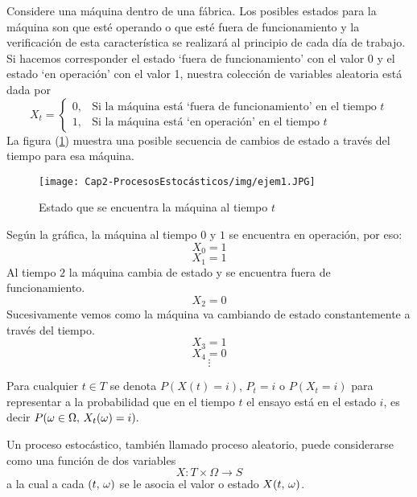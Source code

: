 \begin{Ejm}
    Considere una máquina dentro de una fábrica. Los
    posibles estados para la máquina son que esté operando o que esté fuera de funcionamiento
    y la verificación de esta característica se realizará al principio de cada día de trabajo. Si
    hacemos corresponder el estado `fuera de funcionamiento' con el valor 0 y el estado `en operación' con el valor 1, nuestra colección de variables aleatoria está dada por 
    $$X_t=
    \label{ejm-procEstocástico}
    \begin{cases}
        0, & \mbox{Si la máquina está `fuera de funcionamiento' en el tiempo $t$}\\
        1, & \mbox{Si la máquina está `en operación' en el tiempo $t$}
    \end{cases}$$
    La figura (\ref{fig-procesoEstocástico-Ejemplo}) muestra una posible secuencia de cambios de estado a través del tiempo para esa máquina.
    \begin{center}
        \begin{figure}[htb]
            \begin{center}
             \texttt{[image: Cap2-ProcesosEstocásticos/img/ejem1.JPG]}
                \vspace*{0.05in}
            \end{center}
            \caption{Estado que se encuentra la máquina al tiempo $t$ }
            \label{fig-procesoEstocástico-Ejemplo}
        \end{figure}
    \end{center}
    Según la gráfica, la máquina al tiempo $0$ y $1$ se encuentra en operación, por eso:
    $$X_0=1$$
    $$X_1=1$$
    Al tiempo $2$ la máquina cambia de estado y se encuentra fuera de funcionamiento. 
    $$X_2=0$$
   Sucesivamente vemos como la máquina va cambiando de estado constantemente a través del tiempo.
    $$X_3=1$$
    $$X_4=0$$
    $$\vdots$$
\end{Ejm}
\begin{Obs}
Para cualquier $t\in T$ se denota $P(X(t)=i)$, $P_t=i$ o $P(X_t=i)$ para representar a la probabilidad que en el tiempo $t$ el ensayo está en el estado $i$, es decir $P(\omega\in\Omega,\thinspace X_t(\omega)=i).$
\end{Obs}
Un proceso estocástico, también llamado proceso aleatorio, puede considerarse como una función de dos variables
$$X:T\times\Omega\rightarrow S$$ a la cual a cada $(t,\thinspace\omega)$ se le asocia el valor o estado $X (t,\thinspace\omega) $.\\

